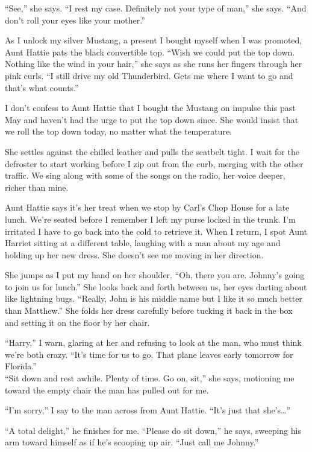 \documentclass[
]{article}
\begin{document}
``See,'' she says. ``I rest my case. Definitely not your type of man,''
she says. ``And don't roll your eyes like your mother.''

As I unlock my silver Mustang, a present I bought myself when I was
promoted, Aunt Hattie pats the black convertible top. ``Wish we could
put the top down. Nothing like the wind in your hair,'' she says as she
runs her fingers through her pink curls. ``I still drive my old
Thunderbird. Gets me where I want to go and that's what counts.''

I don't confess to Aunt Hattie that I bought the Mustang on impulse this
past May and haven't had the urge to put the top down since. She would
insist that we roll the top down today, no matter what the temperature.

She settles against the chilled leather and pulls the seatbelt tight. I
wait for the defroster to start working before I zip out from the curb,
merging with the other traffic. We sing along with some of the songs on
the radio, her voice deeper, richer than mine.

Aunt Hattie says it's her treat when we stop by Carl's Chop House for a
late lunch. We're seated before I remember I left my purse locked in the
trunk. I'm irritated I have to go back into the cold to retrieve it.
When I return, I spot Aunt Harriet sitting at a different table,
laughing with a man about my age and holding up her new dress. She
doesn't see me moving in her direction.

She jumps as I put my hand on her shoulder. ``Oh, there you are.
Johnny's going to join us for lunch.'' She looks back and forth between
us, her eyes darting about like lightning bugs. ``Really, John is his
middle name but I like it so much better than Matthew.'' She folds her
dress carefully before tucking it back in the box and setting it on the
floor by her chair.

``Harry,'' I warn, glaring at her and refusing to look at the man, who
must think we're both crazy. ``It's time for us to go. That plane leaves
early tomorrow for Florida.''\\
``Sit down and rest awhile. Plenty of time. Go on, sit,'' she says,
motioning me toward the empty chair the man has pulled out for me.

``I'm sorry,'' I say to the man across from Aunt Hattie. ``It's just
that she's\ldots''

``A total delight,'' he finishes for me. ``Please do sit down,'' he
says, sweeping his arm toward himself as if he's scooping up air. ``Just
call me Johnny.''
\end{document}
